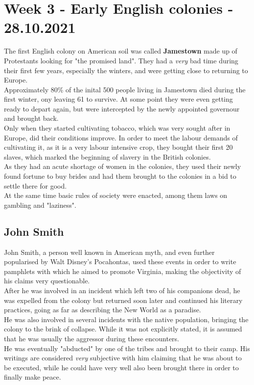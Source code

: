 \documentclass{article}
\begin{document}
	\section{Week 3 - Early English colonies - 28.10.2021}
	The first English colony on American soil was called \textbf{Jamestown} made up of Protestants looking for "the promised land". They had a \textit{very} bad time during their first few years, especially the winters, and were getting close to returning to Europe. \\
	Approximately 80\% of the inital 500 people living in Jamestown died during the first winter, ony leaving 61 to survive. At some point they were even getting ready to depart again, but were intercepted by the newly appointed governour and brought back. \\
	Only when they started cultivating tobacco, which was very sought after in Europe, did their conditions improve. In order to meet the labour demands of cultivating it, as it is a very labour intensive crop, they bought their first 20 slaves, which marked the beginning of slavery in the British colonies. \\
	As they had an acute shortage of women in the colonies, they used their newly found fortune to buy brides and had them brought to the colonies in a bid to settle there for good. \\
	At the same time basic rules of society were enacted, among them laws on gambling and "laziness".\\
	\subsection{John Smith}
	John Smith, a person well known in American myth, and even further popularised by Walt Disney's Pocahontas, used these events in order to write pamphlets with which he aimed to promote Virginia, making the objectivity of his claims very questionable. \\
	After he was involved in an incident which left two of his companions dead, he was expelled from the colony but returned soon later and continued his literary practices, going as far as describing the New World as a paradise. \\
	He was also involved in several incidents with the native population, bringing the colony to the brink of collapse. While it was not explicitly stated, it is assumed that he was usually the aggressor during these encounters. \\
	He was eventually "abducted" by one of the tribes and brought to their camp. His writings are considered \textit{very} subjective with him claiming that he was about to be executed, while he could have very well also been brought there in order to finally make peace. \\
\end{document}
